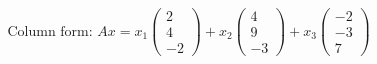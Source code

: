 \documentclass[preview]{standalone}
\begin{document}
\begin{align*}
\text{Column form: } Ax = x_1 \begin{pmatrix} 2 \\ 4 \\ -2 \end{pmatrix} +x_2 \begin{pmatrix} 4 \\ 9 \\ -3 \end{pmatrix} +x_3 \begin{pmatrix} -2 \\ -3 \\ 7 \end{pmatrix}
\end{align*}
\end{document}
